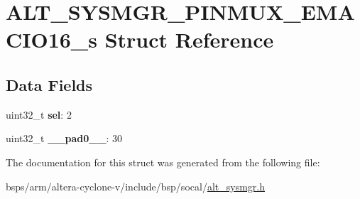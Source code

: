 \hypertarget{structALT__SYSMGR__PINMUX__EMACIO16__s}{}\section{A\+L\+T\+\_\+\+S\+Y\+S\+M\+G\+R\+\_\+\+P\+I\+N\+M\+U\+X\+\_\+\+E\+M\+A\+C\+I\+O16\+\_\+s Struct Reference}
\label{structALT__SYSMGR__PINMUX__EMACIO16__s}
\subsection*{Data Fields}
\begin{DoxyCompactItemize}
\item 
\mbox{\label{structALT__SYSMGR__PINMUX__EMACIO16__s_a25ef4933c222dd715f19bc2902e09f45}} 
uint32\+\_\+t {\bfseries sel}\+: 2
\item 
\mbox{\label{structALT__SYSMGR__PINMUX__EMACIO16__s_aa8dcdbe94a7942bdd71d09285600247a}} 
uint32\+\_\+t {\bfseries \+\_\+\+\_\+pad0\+\_\+\+\_\+}\+: 30
\end{DoxyCompactItemize}


The documentation for this struct was generated from the following file\+:\begin{DoxyCompactItemize}
\item 
bsps/arm/altera-\/cyclone-\/v/include/bsp/socal/\mbox{\hyperlink{alt__sysmgr_8h}{alt\+\_\+sysmgr.\+h}}\end{DoxyCompactItemize}
